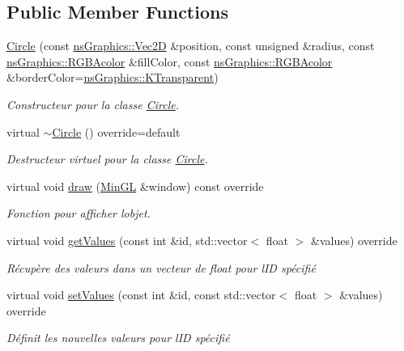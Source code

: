 \subsection*{Public Member Functions}
\begin{DoxyCompactItemize}
\item 
\hyperlink{classns_shape_1_1_circle_a06b1c1c7ea1e4ec8228d929e7b3966ee}{Circle} (const \hyperlink{classns_graphics_1_1_vec2_d}{ns\+Graphics\+::\+Vec2D} \&position, const unsigned \&radius, const \hyperlink{classns_graphics_1_1_r_g_b_acolor}{ns\+Graphics\+::\+R\+G\+B\+Acolor} \&fill\+Color, const \hyperlink{classns_graphics_1_1_r_g_b_acolor}{ns\+Graphics\+::\+R\+G\+B\+Acolor} \&border\+Color=\hyperlink{namespacens_graphics_ab2001ad03cceb2565849e04465618c1e}{ns\+Graphics\+::\+K\+Transparent})
\begin{DoxyCompactList}\small\item\em Constructeur pour la classe \hyperlink{classns_shape_1_1_circle}{Circle}. \end{DoxyCompactList}\item 
virtual \hyperlink{classns_shape_1_1_circle_a2446e688c063dcb2693adfcfacbb2804}{$\sim$\+Circle} () override=default
\begin{DoxyCompactList}\small\item\em Destructeur virtuel pour la classe \hyperlink{classns_shape_1_1_circle}{Circle}. \end{DoxyCompactList}\item 
virtual void \hyperlink{classns_shape_1_1_circle_a279581f6104719395091039cea1707e5}{draw} (\hyperlink{class_min_g_l}{Min\+GL} \&window) const override
\begin{DoxyCompactList}\small\item\em Fonction pour afficher l\textquotesingle{}objet. \end{DoxyCompactList}\item 
virtual void \hyperlink{classns_shape_1_1_circle_a2d126b4d87ea0b141cf1bac7150f760e}{get\+Values} (const int \&id, std\+::vector$<$ float $>$ \&values) override
\begin{DoxyCompactList}\small\item\em Récupère des valeurs dans un vecteur de float pour l\textquotesingle{}ID spécifié \end{DoxyCompactList}\item 
virtual void \hyperlink{classns_shape_1_1_circle_a3edfd0468ef78f456c4fc4fd57c84cdf}{set\+Values} (const int \&id, const std\+::vector$<$ float $>$ \&values) override
\begin{DoxyCompactList}\small\item\em Définit les nouvelles valeurs pour l\textquotesingle{}ID spécifié \end{DoxyCompactList}\item 

\end{DoxyCompactItemize}
